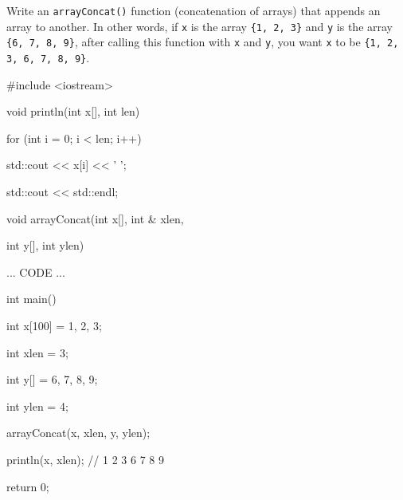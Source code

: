 Write an \texttt{arrayConcat()} function (concatenation of arrays) that appends an array to another. In other words, if \texttt{x} is the array \texttt{\{1, 2, 3\}} and \texttt{y} is the array \texttt{\{6, 7, 8, 9\}}, after calling this function with \texttt{x} and \texttt{y}, you want \texttt{x} to be \texttt{\{1, 2, 3, 6, 7, 8, 9\}}.



\begin{consolethree}[escapeinside=||]

#include <iostream>



void println(int x[], int len)

{

    for (int i = 0; i < len; i++)

    {

        std::cout << x[i] << ' ';

    }

    std::cout << std::endl;

}



void arrayConcat(int x[], int & xlen,

                 int y[], int ylen)

{

    ... CODE ...

}



int main()

{

    int x[100] = {1, 2, 3};

    int xlen = 3;

    int y[] = {6, 7, 8, 9};

    int ylen = 4;

    arrayConcat(x, xlen, y, ylen);

    println(x, xlen); // 1 2 3 6 7 8 9

    return 0;

}

\end{consolethree}

